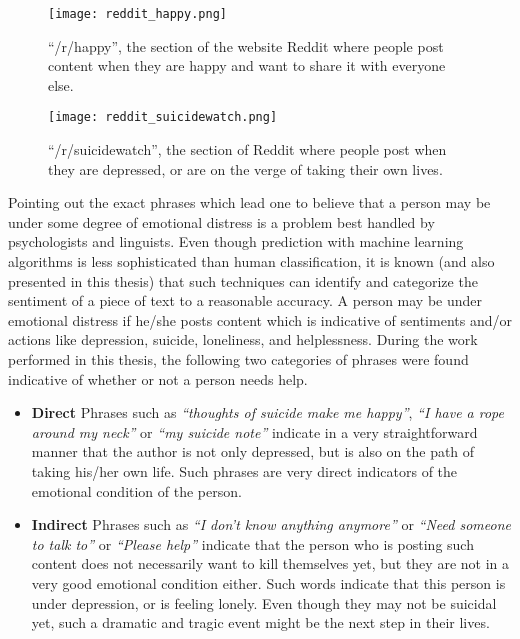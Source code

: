 \begin{figure}[t!]
    \centering
    \texttt{[image: reddit\_happy.png]}
    \caption{``/r/happy'', the section of the website Reddit where people post content when they are happy and want to share it with everyone else.}
    \label{fig:reddit_happy}
\end{figure}

\begin{figure}[t!]
    \centering
    \texttt{[image: reddit\_suicidewatch.png]}
    \caption{``/r/suicidewatch'', the section of Reddit where people post when they are depressed, or are on the verge of taking their own lives.}
    \label{fig:reddit_suicidewatch}
\end{figure}

Pointing out the exact phrases which lead one to believe that a person may be under some degree of emotional distress is a problem best handled by psychologists and linguists. Even though prediction with machine learning algorithms is less sophisticated than human classification, it is known (and also presented in this thesis) that such techniques can identify and categorize the sentiment of a piece of text to a reasonable accuracy. A person may be under emotional distress if he/she posts content which is indicative of sentiments and/or actions like depression, suicide, loneliness, and helplessness. During the work performed in this thesis, the following two categories of phrases were found indicative of whether or not a person needs help.

\begin{itemize}
    \item{\textbf{Direct} Phrases such as \emph{``thoughts of suicide make me happy''}, \emph{``I have a rope around my neck''} or \emph{``my suicide note''} indicate in a very straightforward manner that the author is not only depressed, but is also on the path of taking his/her own life. Such phrases are very direct indicators of the emotional condition of the person.}
    \item{\textbf{Indirect} Phrases such as \emph{``I don't know anything anymore''} or \emph{``Need someone to talk to''} or \emph{``Please help''} indicate that the person who is posting such content does not necessarily want to kill themselves yet, but they are not in a very good emotional condition either. Such words indicate that this person is under depression, or is feeling lonely. Even though they may not be suicidal yet, such a dramatic and tragic event might be the next step in their lives.}
\end{itemize}

